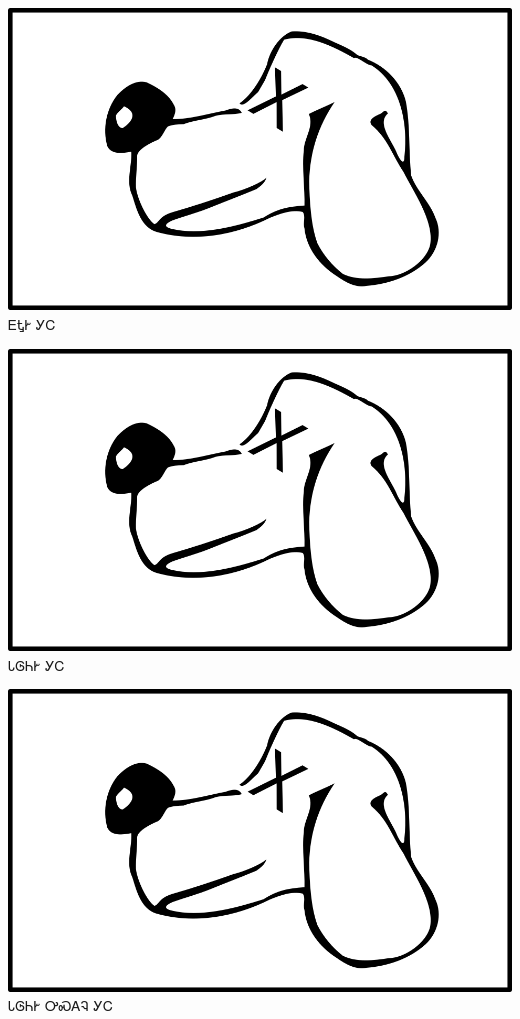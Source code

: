 \documentclass[avery5371]{flashcards}%
\begin{document}
    \begin{flashcard}{
        \includegraphics[width=0.95\columnwidth,height=.51\columnwidth,keepaspectratio]{../artwork/for-colors/gihli-dead}
    }
        \Huge ᎬᎿᎨ ᎩᏟ
    \end{flashcard}

    \begin{flashcard}{
        \includegraphics[width=0.95\columnwidth,height=.51\columnwidth,keepaspectratio]{../artwork/for-colors/gihli-dead}
    }
        \Huge ᏓᎶᏂᎨ ᎩᏟ
    \end{flashcard}

    \begin{flashcard}{
        \includegraphics[width=0.95\columnwidth,height=.51\columnwidth,keepaspectratio]{../artwork/for-colors/gihli-dead}
    }
        \Huge ᏓᎶᏂᎨ ᎤᏍᎪᎸ ᎩᏟ
    \end{flashcard}
\end{document}
